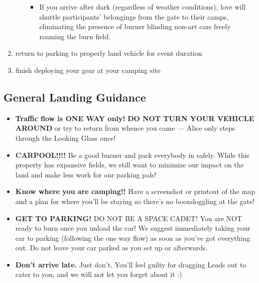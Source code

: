 \begin{enumerate}[noitemsep]
\begin{itemize}
\begin{itemize}
                \item If you arrive after dark (regardless of weather conditions), \gls{love} will shuttle participants' belongings from the \gls{gate} to their camps, eliminating the presence of burner blinding non-art cars freely roaming the burn field.
             \end{itemize}
      \end{itemize}
    \item return to \gls{parking} to properly land vehicle for event duration
    \item finish deploying your gear at your camping site
\end{enumerate}

\subsection*{General Landing Guidance}

\begin{itemize}[noitemsep]
    \item \textbf{Traffic flow is ONE WAY only!} \textbf{DO NOT TURN YOUR VEHICLE AROUND} or try to return from whence you came --- Alice only steps through the Looking Glass once!
    \item \textbf{CARPOOL!!!!} Be a good burner and pack everybody in safely. While this property has expansive fields, we still want to minimize our impact on the land and make less work for our parking pals!
    \item \textbf{Know where you are camping!!} Have a screenshot or printout of the map and a plan for where you'll be staying so there's no boondoggling at the gate!
    \item \textbf{GET TO PARKING!} DO NOT BE A SPACE CADET! You are NOT ready to burn once you unload the car! We suggest immediately taking your car to parking (following the one way flow) as soon as you've got everything out. Do not leave your car parked as you set up or afterwards. 
    \item \textbf{Don't arrive late.} Just don't. You'll feel guilty for dragging Leads out to cater to you, and we will not let you forget about it :)
\end{itemize}

